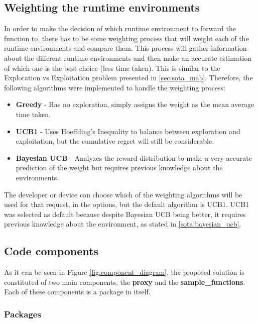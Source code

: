 \documentclass[conference]{IEEEtran}
\begin{document}
\subsection{Weighting the runtime environments}

In order to make the decision of which runtime environment to forward the function
to, there has to be some weighting process that will weight each of the runtime
environments and compare them. This process will gather information about the
different runtime environments and then make an accurate estimation of which one
is the best choice (less time taken). This is similar to the Exploration vs
Exploitation problem presented in \ref{sec:sota_mab}. Therefore, the following
algorithms were implemented to handle the weighting process:

\begin{itemize}
    \item \textbf{Greedy} - Has no exploration, simply assigns the weight as the
        mean average time taken.
    \item \textbf{UCB1} - Uses Hoeffding's Inequality to balance between
        exploration and exploitation, but the cumulative regret will still be
        considerable.
    \item \textbf{Bayesian UCB} - Analyzes the reward distribution to make a very
        accurate prediction of the weight but requires previous knowledge about the
        environments.
\end{itemize}

The developer or device can choose which of the weighting algorithms will be used
for that request, in the options, but the default algorithm is UCB1. UCB1 was
selected as default because despite Bayesian UCB being better, it requires
previous knowledge about the environment, as stated in \ref{sota:bayesian_ucb}.

\subsection{Code components}

As it can be seen in Figure \ref{fig:component_diagram}, the proposed solution is
constituted of two main components, the \textbf{proxy} and the
\textbf{sample\_functions}. Each of these components is a package in itself.

\subsubsection{Packages}
\end{document}
